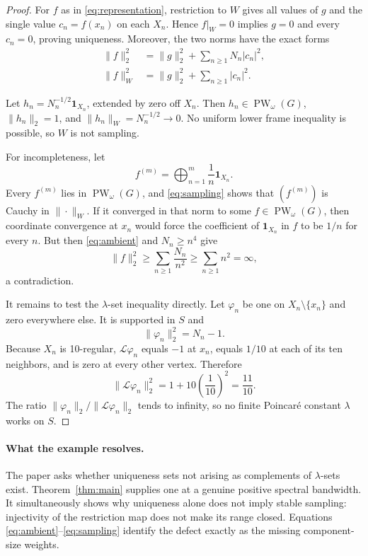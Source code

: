 \documentclass[11pt]{article}
\newcommand{\PW}{\operatorname{PW}}
\newcommand{\cL}{\mathcal L}
\newcommand{\one}{\mathbf 1}
\begin{document}
\begin{proof}
For \(f\) as in \eqref{eq:representation}, restriction to \(W\) gives all
values of \(g\) and the single value \(c_n=f(x_n)\) on each \(X_n\).  Hence
\(f|_W=0\) implies \(g=0\) and every \(c_n=0\), proving uniqueness.  Moreover,
the two norms have the exact forms
\begin{align}
 \|f\|_2^2&=\|g\|_2^2+\sum_{n\ge1}N_n|c_n|^2,\label{eq:ambient}\\
 \|f\|_W^2&=\|g\|_2^2+\sum_{n\ge1}|c_n|^2.\label{eq:sampling}
\end{align}

Let \(h_n=N_n^{-1/2}\one_{X_n}\), extended by zero off \(X_n\).  Then
\(h_n\in\PW_\omega(G)\), \(\|h_n\|_2=1\), and
\(\|h_n\|_W=N_n^{-1/2}\to0\).  No uniform lower frame inequality is
possible, so \(W\) is not sampling.

For incompleteness, let
\[
 f^{(m)}=\bigoplus_{n=1}^{m}\frac1n\one_{X_n}.
\]
Every \(f^{(m)}\) lies in \(\PW_\omega(G)\), and \eqref{eq:sampling} shows
that \((f^{(m)})\) is Cauchy in \(\|\cdot\|_W\).  If it converged in that
norm to some \(f\in\PW_\omega(G)\), then coordinate convergence at \(x_n\)
would force the coefficient of \(\one_{X_n}\) in \(f\) to be \(1/n\) for
every \(n\).  But then \eqref{eq:ambient} and \(N_n\ge n^4\) give
\[
 \|f\|_2^2\ge\sum_{n\ge1}\frac{N_n}{n^2}
 \ge\sum_{n\ge1}n^2=\infty,
\]
a contradiction.

It remains to test the \(\lambda\)-set inequality directly.  Let \(\varphi_n\)
be one on \(X_n\setminus\{x_n\}\) and zero everywhere else.  It is supported
in \(S\) and
\[
 \|\varphi_n\|_2^2=N_n-1.
\]
Because \(X_n\) is 10-regular, \(\cL\varphi_n\) equals \(-1\) at \(x_n\),
equals \(1/10\) at each of its ten neighbors, and is zero at every other
vertex.  Therefore
\[
 \|\cL\varphi_n\|_2^2=1+10\left(\frac1{10}\right)^2=\frac{11}{10}.
\]
The ratio \(\|\varphi_n\|_2/\|\cL\varphi_n\|_2\) tends to infinity, so no
finite Poincar\'e constant \(\lambda\) works on \(S\).
\end{proof}

\paragraph{What the example resolves.}
The paper asks whether uniqueness sets not arising as complements of
\(\lambda\)-sets exist.  Theorem~\ref{thm:main} supplies one at a genuine
positive spectral bandwidth.  It simultaneously shows why uniqueness alone
does not imply stable sampling: injectivity of the restriction map does not
make its range closed.  Equations \eqref{eq:ambient}--\eqref{eq:sampling}
identify the defect exactly as the missing component-size weights.
\end{document}
